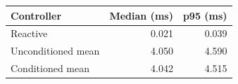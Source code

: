 \begin{tabular}{lrr}
\toprule
Controller & Median (ms) & p95 (ms) \\
\midrule
Reactive & 0.021 & 0.039 \\
Unconditioned mean & 4.050 & 4.590 \\
Conditioned mean & 4.042 & 4.515 \\
\bottomrule
\end{tabular}
